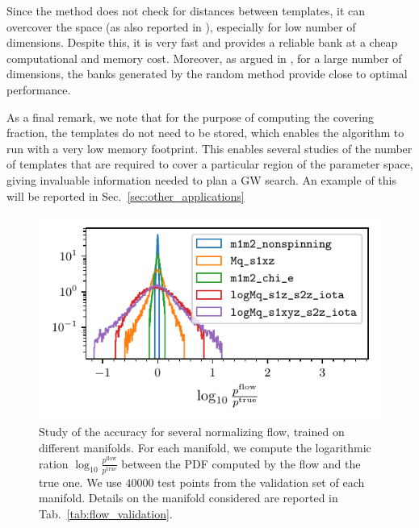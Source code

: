\documentclass[twocolumn,showpacs,preprintnumbers,nofootinbib,prd,
superscriptaddress,10pt]{revtex4-2}
\begin{document}
Since the method does not check for distances between templates, it can overcover the space (as also reported in \cite{Messenger:2008ta, Coogan:2022qxs}), especially for low number of dimensions.
Despite this, it is very fast and provides a reliable bank at a cheap computational and memory cost.
Moreover, as argued in \cite{Messenger:2008ta, Allen:2021yuy, Allen:2022lqr}, for a large number of dimensions, the banks generated by the random method provide close to optimal performance.

As a final remark, we note that for the purpose of computing the covering fraction, the templates do not need to be stored, which enables the algorithm to run with a very low memory footprint.
This enables several studies of the number of templates that are required to cover a particular region of the parameter space, giving invaluable information needed to plan a GW search. An example of this will be reported in Sec.~\ref{sec:other_applications}

\begin{figure}[t]
	\centering
	\includegraphics[scale = 1.]{flow_validation}
	\caption{Study of the accuracy for several normalizing flow, trained on different manifolds. For each manifold, we compute the logarithmic ration $\log_{10}\frac{p^\mathrm{flow}}{p^\mathrm{true}}$ between the PDF computed by the flow and the true one. We use $40000$ test points from the validation set of each manifold. Details on the manifold considered are reported in Tab.~\ref{tab:flow_validation}.}
	\label{fig:flow_validation}
\end{figure}
\end{document}
